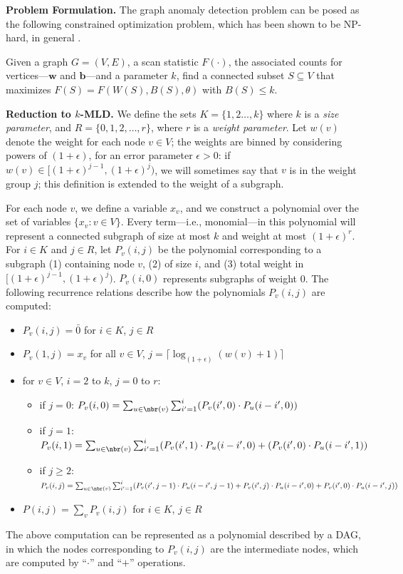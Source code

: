 \noindent
\textbf{Problem Formulation.}
The graph anomaly detection problem can be posed as the following constrained optimization problem,
which has been shown to be NP-hard, in general \cite{cadena:sdm17}.

\begin{problem}
\label{prob:macs}
Given a graph $G=(V, E)$, a scan statistic $F(\cdot)$, the associated counts for vertices---$\mathbf{w}$ and $\mathbf{b}$---and a parameter $k$, find a connected subset $S\subseteq V$ that maximizes $F(S) = F(W(S), B(S), \theta)$ with $B(S) \leq k$.
\end{problem}

\noindent
\textbf{Reduction to $k$-MLD.}
We define the sets $K=\{1,2 \ldots, k\}$ where $k$ is a \emph{size parameter},
and $R=\{0,1,2,\ldots, r\}$, where $r$ is a \emph{weight parameter}. Let $w(v)$ denote the
weight for each node $v\in V$; the weights are binned by considering powers of $(1+\epsilon)$, for an error parameter $\epsilon>0$: if $w(v)\in [(1+ \epsilon)^{j-1}, (1+ \epsilon)^{j})$, we will sometimes say that $v$ is
in the weight group $j$; this definition is extended to the weight of a subgraph.

For each node $v$, we define a variable $x_v$, and we construct a polynomial over the set of variables $\{x_v: v \in V\}$. Every term---i.e., monomial---in this polynomial will represent a connected subgraph of size at most $k$ and weight at most $(1+ \epsilon)^r$.
For $i \in K$ and $j \in R$, let $P_v(i,j)$ be the polynomial corresponding to a subgraph (1) containing node $v$, (2) of size $i$, and (3) total weight in
$[(1+ \epsilon)^{j-1}, (1+ \epsilon)^{j})$. $P_v(i,0)$ represents subgraphs of weight 0.
The following recurrence relations describe how the polynomials $P_v(i, j)$ are computed:
\begin{itemize}
\item
$P_v(i, j) = \bar{0}$ for $i \in K$, $j \in R$
\item
$P_v(1, j) = x_v$ for all $v \in V$, $j = \lceil \log_{(1 + \epsilon)} (w(v) + 1)\rceil$
\item
for $v \in V$, $i = 2$ to $k$, $j = 0$ to $r$:
\begin{itemize}
\item
if $j=0$: $P_v(i,0) = \sum_{u \in \nbr(v)} \sum_{i' = 1}^i (P_v(i',0) \cdot P_u(i-i', 0))$
\item
if $j=1$:
$P_v(i,1) = \sum_{u \in \nbr(v)} \sum_{i' = 1}^i (P_v(i', 1) \cdot P_u(i-i', 0) + (P_v(i', 0) \cdot P_u(i-i', 1))$
\item
if $j\geq 2$:
$P_v(i,j) = \sum_{u \in \nbr(v)} \sum_{i' = 1}^i (P_v(i', j - 1) \cdot P_u(i-i', j - 1) +
P_v(i', j) \cdot P_u(i-i', 0) + P_v(i', 0) \cdot P_u(i-i', j))$
\end{itemize}
\item
$P(i,j) = \sum_v P_v(i,j)$ for $i \in K$, $j \in R$
\end{itemize}

The above computation can be represented as a polynomial described by a DAG, in which the
nodes corresponding to $P_v(i, j)$ are the intermediate nodes, which are computed by ``$\cdot$'' and ``$+$''
operations.